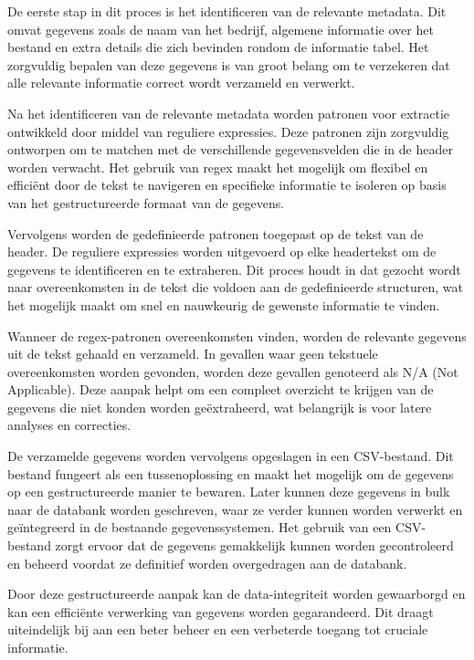 De eerste stap in dit proces is het identificeren van de relevante metadata. Dit omvat gegevens zoals de naam van het bedrijf, algemene informatie over het bestand en extra details die zich bevinden rondom de informatie tabel. Het zorgvuldig bepalen van deze gegevens is van groot belang om te verzekeren dat alle relevante informatie correct wordt verzameld en verwerkt.

Na het identificeren van de relevante metadata worden patronen voor extractie ontwikkeld door middel van reguliere expressies. Deze patronen zijn zorgvuldig ontworpen om te matchen met de verschillende gegevensvelden die in de header worden verwacht. Het gebruik van regex maakt het mogelijk om flexibel en efficiënt door de tekst te navigeren en specifieke informatie te isoleren op basis van het gestructureerde formaat van de gegevens.



Vervolgens worden de gedefinieerde patronen toegepast op de tekst van de header. De reguliere expressies worden uitgevoerd op elke headertekst om de gegevens te identificeren en te extraheren. Dit proces houdt in dat gezocht wordt naar overeenkomsten in de tekst die voldoen aan de gedefinieerde structuren, wat het mogelijk maakt om snel en nauwkeurig de gewenste informatie te vinden.



Wanneer de regex-patronen overeenkomsten vinden, worden de relevante gegevens uit de tekst gehaald en verzameld. In gevallen waar geen tekstuele overeenkomsten worden gevonden, worden deze gevallen genoteerd als N/A (Not Applicable). Deze aanpak helpt om een compleet overzicht te krijgen van de gegevens die niet konden worden geëxtraheerd, wat belangrijk is voor latere analyses en correcties.

De verzamelde gegevens worden vervolgens opgeslagen in een CSV-bestand. Dit bestand fungeert als een tussenoplossing en maakt het mogelijk om de gegevens op een gestructureerde manier te bewaren. Later kunnen deze gegevens in bulk naar de databank worden geschreven, waar ze verder kunnen worden verwerkt en geïntegreerd in de bestaande gegevenssystemen. Het gebruik van een CSV-bestand zorgt ervoor dat de gegevens gemakkelijk kunnen worden gecontroleerd en beheerd voordat ze definitief worden overgedragen aan de databank.

Door deze gestructureerde aanpak kan de data-integriteit worden gewaarborgd en kan een efficiënte verwerking van gegevens worden gegarandeerd. Dit draagt uiteindelijk bij aan een beter beheer en een verbeterde toegang tot cruciale informatie.




